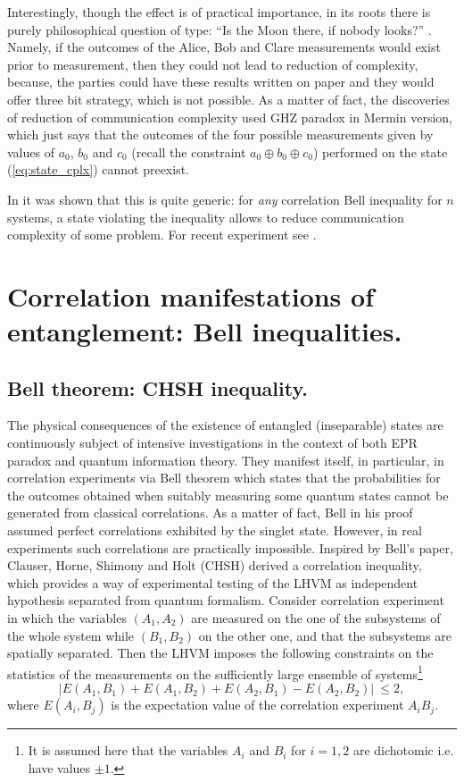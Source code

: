 \documentclass[twocolumn,aps,rmp]{revtex4}
\begin{document}
Interestingly, though the effect is of practical importance, in its
roots there is purely philosophical question of type: ``Is the Moon
there, if nobody looks?'' \cite{MerminMoon}. Namely, if the outcomes
of the Alice, Bob and Clare measurements would exist prior to
measurement, then they could not lead to reduction of complexity,
because, the parties could have these results written on paper and
they would offer three bit strategy, which is not possible. As a
matter of fact, the discoveries of reduction of communication
complexity used GHZ paradox in Mermin version, which just says that
the outcomes of the four possible measurements given by values of
$a_0$, $b_0$ and $c_0$ (recall the constraint $a_0 \oplus b_0 \oplus
c_0$) performed on the state (\ref{eq:state_cplx}) cannot preexist.

In \cite{BruknerZPZ2002-Bell-complexity} it was shown that this is
quite generic: for {\it any} correlation Bell inequality
for $n$ systems,  a state violating the inequality allows to reduce
communication complexity of some problem. For recent experiment see
\cite{Exper_cplx}.



\section{Correlation manifestations of entanglement: Bell inequalities.}
\label{sec:Bell}

\subsection {Bell theorem: CHSH inequality.}

The physical consequences of the existence of entangled (inseparable)
states are continuously subject of intensive investigations in the
context of both EPR paradox and quantum information theory. They
manifest itself, in particular, in correlation experiments via Bell
theorem which states that the probabilities for the outcomes obtained
when suitably measuring some quantum states cannot be generated from
classical correlations. As a matter of fact, Bell in his proof assumed
perfect correlations exhibited by the singlet state. However, in real
experiments such correlations are practically impossible. Inspired by
Bell's paper, Clauser, Horne, Shimony and Holt (CHSH) \cite {CHSH}
derived a correlation inequality, which provides a way of experimental
testing of the LHVM as independent hypothesis separated from quantum
formalism. Consider correlation experiment in which the variables
$({A}_1,{A}_2)$ are measured on the one of the subsystems of the whole
system while $({ B}_1,{B}_2)$ on the other one, and that the
subsystems are spatially separated. Then the LHVM imposes the
following constraints on the statistics of the measurements on the
sufficiently large ensemble of systems\footnote{It is assumed here
  that the variables $A_i$ and $B_i$ for $i=1,2$ are dichotomic
  i.e. have values $\pm 1$.}
\begin{equation}
|E(A_1,B_1)+E(A_1,B_2)+E(A_2,B_1)-E(A_2,B_2)|\ \leq 2, \label{trzy}
\end{equation}
where $E(A_i,B_j)$ is the expectation value of the correlation
experiment $A_iB_j$.
\end{document}
